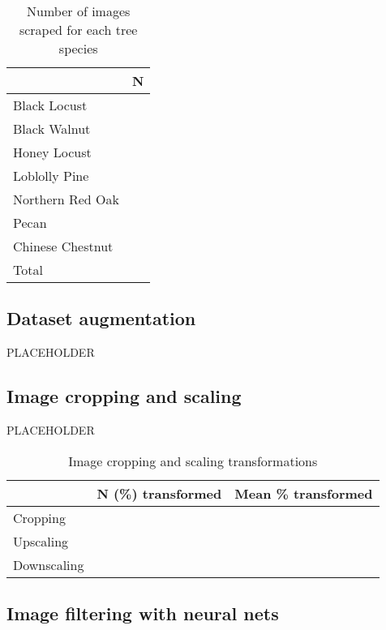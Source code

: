 \documentclass[10pt,twocolumn,letterpaper]{article}
\begin{document}
\begin{table}
\begin{center}
\begin{tabular}{|l|c|}
\hline
& N \\
\hline\hline
Black Locust & \\
Black Walnut & \\
Honey Locust & \\
Loblolly Pine & \\
Northern Red Oak & \\
Pecan & \\
Chinese Chestnut & \\
\hline\hline
Total & \\
\hline
\end{tabular}
\end{center}
\caption{Number of images scraped for each tree species}
\end{table}

\subsection{Dataset augmentation}

PLACEHOLDER

\subsection{Image cropping and scaling}

PLACEHOLDER

\begin{table}
\begin{center}
\begin{tabular}{|l|c|c|}
\hline
& N (\%) transformed & Mean \% transformed \\
\hline\hline
Cropping & & \\
Upscaling & & \\
Downscaling & & \\
\hline
\end{tabular}
\end{center}
\caption{Image cropping and scaling transformations}
\end{table}

\subsection{Image filtering with neural nets}
\end{document}

